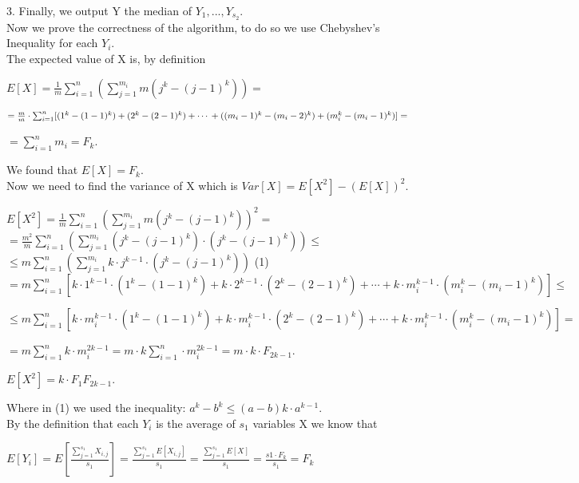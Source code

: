 \documentclass{article}
\begin{document}
3. Finally, we output Y the median of \(Y_{1}, ..., Y_{s_{2}}\).\\

Now we prove the correctness of the algorithm, to do so we use Chebyshev’s Inequality for each \(Y_{i}\).\\
The expected value of X is, by definition
\begin{center}
        \(E\left [ X \right ] = \frac{1}{m}\sum_{i=1}^{n}(\sum_{j=1}^{m_{i}}m(j^{k}-(j-1)^k)) = \)
        
        \(= \frac{m}{m} \cdot \sum_{i=1}^{n} 
        [ (1^{k}-(1-1)^{k})+(2^{k}-(2-1)^{k}) +\cdots \\ \\
        + ((m_{i}-1)^{k}-(m_{i}-2)^{k}) + (m_{i}^{k}-(m_{i}-1)^{k}) ] = \)
        
        \( = \sum_{i=1}^{n} m_{i} = F_k\).
\end{center}
We found that \(E\left [ X \right ] = F_k\).\\
Now we need to find the variance of X which is \(Var[X] = E[X^2] - (E[X])^2\).
\begin{center}
        \(E[X^2] = \frac{1}{m}\sum_{i=1}^{n}(\sum_{j=1}^{m_{i}}m(j^{k}-(j-1)^k))^2 = \)
        \\
        \(= \frac{m^2}{m}\sum_{i=1}^{n}(\sum_{j=1}^{m_{i}}(j^{k}-(j-1)^k)\cdot(j^{k}-(j-1)^k)) \leq  \)
        \\
       \hfill \(\leq m\sum_{i=1}^{n}(\sum_{j=1}^{m_{i}}k\cdot j^{k-1}\cdot(j^{k}-(j-1)^k))\) \hfill (1)
       \\
       \(= m\sum_{i=1}^{n}[ k\cdot1^{k-1}\cdot(1^{k}-(1-1)^{k})+k\cdot2^{k-1}\cdot(2^{k}-(2-1)^{k}) +\cdots
        + k\cdot m_{i}^{k-1}\cdot(m_{i}^{k}-(m_{i}-1)^{k}) ]\leq\)
        
        \(\leq m\sum_{i=1}^{n}[ k\cdot m_{i}^{k-1}\cdot(1^{k}-(1-1)^{k})+k\cdot m_{i}^{k-1}\cdot(2^{k}-(2-1)^{k}) +\cdots
        + k\cdot m_{i}^{k-1}\cdot(m_{i}^{k}-(m_{i}-1)^{k}) ]=\)
        
        \(= m\sum_{i=1}^{n}k\cdot m_{i}^{2k-1} = m\cdot k\sum_{i=1}^{n}\cdot m_{i}^{2k-1} = m\cdot k\cdot F_{2k-1}\).
        
        \(E[X^2] =  k\cdot F_1 F_{2k-1}\).
\end{center}
Where in (1) we used the inequality: \(a^k - b^k \leq (a-b)k\cdot a^{k-1}\).\\
By the definition that each \(Y_i\) is the average of $s_1$ variables X we know that
\begin{center}
    \(E[Y_i] = E[\frac{\sum_{j=1}^{s_1}X_{i,j}}{s_1}] = \frac{\sum_{j=1}^{s_1}E[X_{i,j}]}{s_1} = \frac{\sum_{j=1}^{s_1}E[X]}{s_1} = \frac{s1 \cdot F_k}{s_1} = F_k\)
\end{center}
\end{document}
